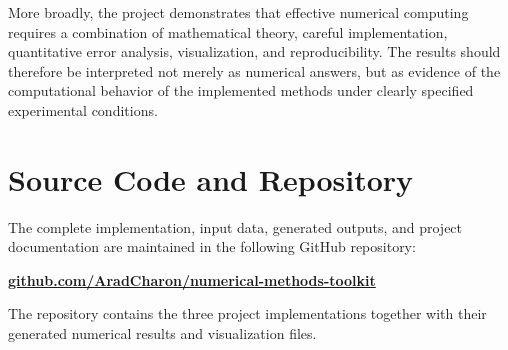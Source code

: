 \documentclass[11pt,a4paper]{article}
\begin{document}
More broadly, the project demonstrates that effective numerical computing
requires a combination of mathematical theory, careful implementation,
quantitative error analysis, visualization, and reproducibility. The
results should therefore be interpreted not merely as numerical answers,
but as evidence of the computational behavior of the implemented methods
under clearly specified experimental conditions.


\newpage

\section{Source Code and Repository}

The complete implementation, input data, generated outputs, and project
documentation are maintained in the following GitHub repository:

\begin{center}

\href{https://github.com/AradCharon/numerical-methods-toolkit}
{\Large\textbf{\textcolor{primary}{
github.com/AradCharon/numerical-methods-toolkit
}}}

\end{center}

The repository contains the three project implementations together with
their generated numerical results and visualization files.


\newpage




\end{document}
